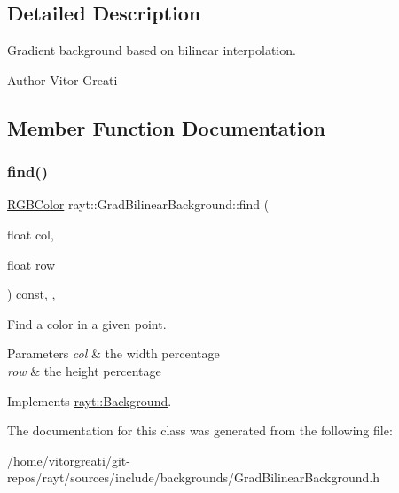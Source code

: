 \subsection{Detailed Description}
Gradient background based on bilinear interpolation. 

\begin{DoxyAuthor}{Author}
Vitor Greati 
\end{DoxyAuthor}


\subsection{Member Function Documentation}
\mbox{\label{classrayt_1_1_grad_bilinear_background_a5619e0167b3ca7a7fb1ab7b9dec1b910}} 
\subsubsection{\texorpdfstring{find()}{find()}}
{\footnotesize\ttfamily \mbox{\hyperlink{classtao_1_1_col}{R\+G\+B\+Color}} rayt\+::\+Grad\+Bilinear\+Background\+::find (\begin{DoxyParamCaption}\item[{float}]{col,  }\item[{float}]{row }\end{DoxyParamCaption}) const\hspace{0.3cm}{\ttfamily [inline]}, {\ttfamily [override]}, {\ttfamily [virtual]}}



Find a color in a given point. 


\begin{DoxyParams}{Parameters}
{\em col} & the width percentage \\
\hline
{\em row} & the height percentage \\
\hline
\end{DoxyParams}


Implements \mbox{\hyperlink{classrayt_1_1_background_ada66e69d97dada79872cd7f79326b8cd}{rayt\+::\+Background}}.



The documentation for this class was generated from the following file\+:\begin{DoxyCompactItemize}
\item 
/home/vitorgreati/git-\/repos/rayt/sources/include/backgrounds/Grad\+Bilinear\+Background.\+h\end{DoxyCompactItemize}

